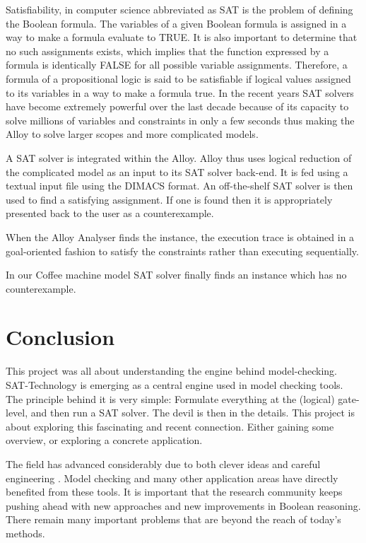 \documentclass[a4paper,12pt]{report}
\begin{document}
\begin{onehalfspacing}
Satisfiability, in computer science abbreviated as SAT is the problem of defining the Boolean formula. The variables of a given Boolean formula is assigned in a way to make a formula evaluate to TRUE. It is also important to determine that no such assignments exists, which implies that the function expressed by a formula is identically FALSE for all possible variable assignments. Therefore, a formula of a propositional logic is said to be satisfiable if logical values assigned to its variables in a way to make a formula true. In the recent years SAT solvers have become extremely powerful over the last decade because of its capacity to solve millions of variables and constraints in only a few seconds thus making the Alloy to solve larger scopes and more complicated models.

A SAT solver is integrated within the Alloy. Alloy thus uses logical reduction of the complicated model as an input to its SAT solver back-end. It is fed using a textual input file using the DIMACS format. An off-the-shelf SAT solver is then used to find a satisfying assignment\cite{Vaziri-Farahani2004}. If one is found then it is appropriately presented back to the user as a counterexample.

When the Alloy Analyser finds the instance, the execution trace is obtained in a goal-oriented fashion to satisfy the constraints rather than executing sequentially.

In our Coffee machine model SAT solver finally finds an instance which has no counterexample.

\chapter{Conclusion}

This project was all about understanding the engine behind model-checking. SAT-Technology is emerging as a central engine used in model checking tools. The principle behind it is very simple: Formulate everything at the (logical) gate-level, and then run a SAT solver. The devil is then in the details. This project is about exploring this fascinating and recent connection. Either gaining some overview, or exploring a concrete application.

The field has advanced considerably due to both clever ideas and careful engineering \cite{R.Bryant1986}. Model checking and many other application areas have directly benefited from these tools. It is important that the research community keeps pushing ahead with new approaches and new improvements in Boolean reasoning. There remain many important problems that are beyond the reach of today's methods.


\end{onehalfspacing}
\end{document}
